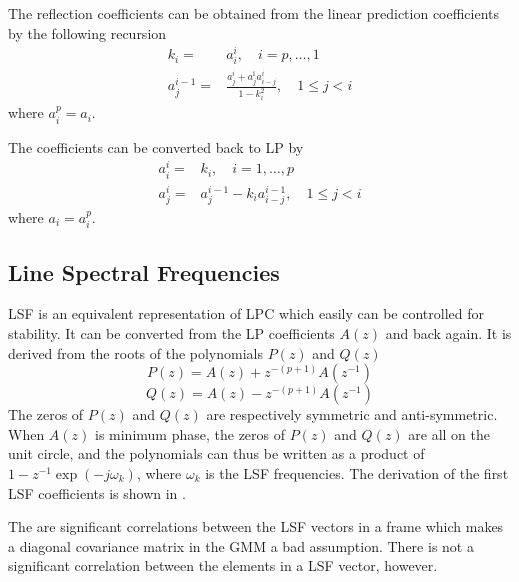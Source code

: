The reflection coefficients can be obtained from the linear prediction coefficients by the following recursion
\begin{equation}
	\begin{split}
		k_i = & a_i^i, \quad i=p,\dotsc,1 \\
		a_j^{i-1} = & \frac{a_j^i+a_j^î a_{i-j}^i}{1-k_i^2}, \quad 1\leq j<i
	\end{split}
\end{equation}
where $a_i^p=a_i$.

The coefficients can be converted back to LP by \cite{taletek}
\begin{equation}
	\begin{split}
		a_i^i = & k_i, \quad i=1,\dotsc,p \\
		a_j^i = & a_j^{i-1}-k_i a_{i-j}^{i-1}, \quad 1\leq j<i
	\end{split}
\end{equation}
where $a_i=a_i^p$.


\subsection{Line Spectral Frequencies} %
\label{sub:line_spectral_frequencies}

LSF is an equivalent representation of LPC which easily can be controlled for stability. It can be converted from the LP coefficients $A(z)$ and back again. It is derived from the roots of the polynomials $P(z)$ and $Q(z)$ 
\begin{equation}
	\label{eq:p_z}
	P(z) = A(z)+z^{-(p+1)}A(z^{-1})
\end{equation}
\begin{equation}
	\label{eq:q_z}
	Q(z) = A(z)-z^{-(p+1)}A(z^{-1})
\end{equation}
The zeros of $P(z)$ and $Q(z)$ are respectively symmetric and anti-symmetric. When $A(z)$ is minimum phase, the zeros of $P(z)$ and $Q(z)$ are all on the unit circle, and the polynomials can thus be written as a product of
$1-z^{-1}\exp(-j\omega_k)$, where $\omega_k$ is the LSF frequencies. The derivation of the first LSF coefficients is shown in \cite[p. 304]{taletek}.

The are significant correlations between the LSF vectors in a frame which makes a diagonal covariance matrix in the GMM a bad assumption. There is not a significant correlation between the elements in a LSF vector, however. 

